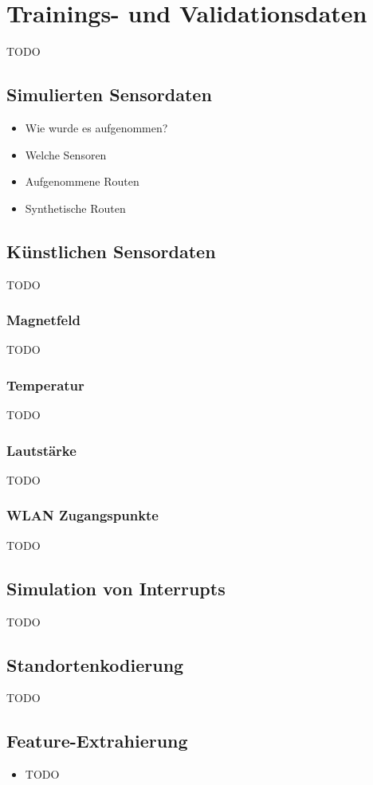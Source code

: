 \chapter{Trainings- und Validationsdaten}
TODO

\section{Simulierten Sensordaten}
\begin{itemize}
    \item Wie wurde es aufgenommen?
    \item Welche Sensoren
    \item Aufgenommene Routen
    \item Synthetische Routen
\end{itemize}

\section{Künstlichen Sensordaten}
TODO

\subsection{Magnetfeld}
TODO

\subsection{Temperatur}
TODO

\subsection{Lautstärke}
TODO

\subsection{WLAN Zugangspunkte}
TODO

\section{Simulation von Interrupts}
TODO

\section{Standortenkodierung}
TODO

\section{Feature-Extrahierung}
\begin{itemize}
    \item TODO
\end{itemize}
